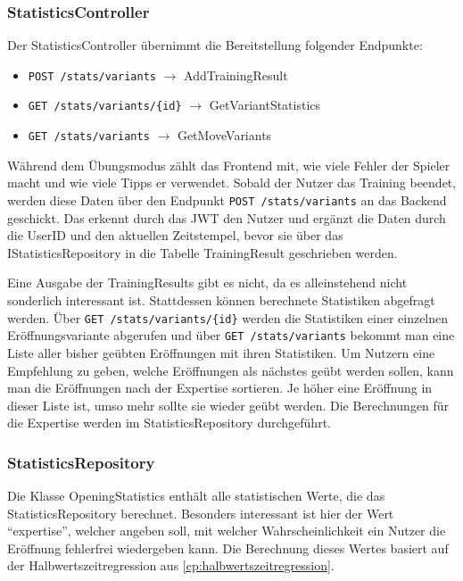 \subsubsection{StatisticsController}
Der StatisticsController übernimmt die Bereitstellung folgender Endpunkte:

\begin{itemize}
  \item \lstinline|POST /stats/variants| $\rightarrow$ AddTrainingResult
  \item \lstinline|GET /stats/variants/{id}| $\rightarrow$ GetVariantStatistics
  \item \lstinline|GET /stats/variants| $\rightarrow$ GetMoveVariants
\end{itemize}

Während dem Übungsmodus zählt das Frontend mit, wie viele Fehler der Spieler macht und wie viele Tipps er verwendet. Sobald der Nutzer das Training beendet, werden diese Daten über den Endpunkt \lstinline{POST /stats/variants} an das Backend geschickt. Das erkennt durch das \ac{JWT} den Nutzer und ergänzt die Daten durch die UserID und den aktuellen Zeitstempel, bevor sie über das IStatisticsRepository in die Tabelle TrainingResult geschrieben werden.

Eine Ausgabe der TrainingResults gibt es nicht, da es alleinstehend nicht sonderlich interessant ist. Stattdessen können berechnete Statistiken abgefragt werden. Über \lstinline|GET /stats/variants/{id}| werden die Statistiken einer einzelnen Eröffnungsvariante abgerufen und über \lstinline|GET /stats/variants| bekommt man eine Liste aller bisher geübten Eröffnungen mit ihren Statistiken. Um Nutzern eine Empfehlung zu geben, welche Eröffnungen als nächstes geübt werden sollen, kann man die Eröffnungen nach der Expertise sortieren. Je höher eine Eröffnung in dieser Liste ist, umso mehr sollte sie wieder geübt werden. Die Berechnungen für die Expertise werden im StatisticsRepository durchgeführt.

\subsubsection{StatisticsRepository}
Die Klasse OpeningStatistics enthält alle statistischen Werte, die das StatisticsRepository berechnet.
Besonders interessant ist hier der Wert \enquote{expertise}, welcher angeben soll, mit welcher Wahrscheinlichkeit ein Nutzer die Eröffnung fehlerfrei wiedergeben kann.
Die Berechnung dieses Wertes basiert auf der Halbwertszeitregression aus \autoref{cp:halbwertszeitregression}.

